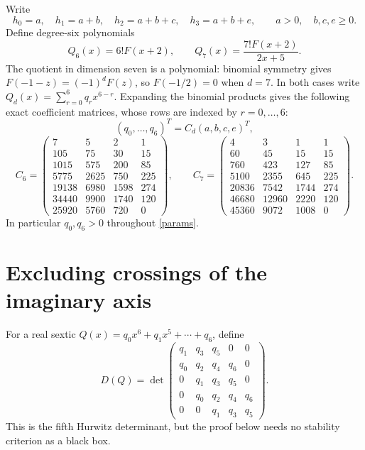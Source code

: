\documentclass[11pt]{article}
\begin{document}
Write
\begin{equation}\label{params}
 h_0=a,\quad h_1=a+b,\quad h_2=a+b+c,\quad h_3=a+b+e,
 \qquad a>0,\quad b,c,e\ge0.
\end{equation}
Define degree-six polynomials
\[
 Q_6(x)=6!F(x+2),\qquad
 Q_7(x)=\frac{7!F(x+2)}{2x+5}.
\]
The quotient in dimension seven is a polynomial: binomial symmetry gives
$F(-1-z)=(-1)^dF(z)$, so $F(-1/2)=0$ when $d=7$.
In both cases write $Q_d(x)=\sum_{r=0}^6 q_r x^{6-r}$.
Expanding the binomial products gives the following exact coefficient
matrices, whose rows are indexed by $r=0,\ldots,6$:
\begin{equation}\label{matrix}
 (q_0,\ldots,q_6)^T=C_d(a,b,c,e)^T,
\end{equation}
\[
 C_6=\begin{pmatrix}
 7&5&2&1\\105&75&30&15\\1015&575&200&85\\5775&2625&750&225\\
 19138&6980&1598&274\\34440&9900&1740&120\\25920&5760&720&0
 \end{pmatrix},\qquad
 C_7=\begin{pmatrix}
 4&3&1&1\\60&45&15&15\\760&423&127&85\\5100&2355&645&225\\
 20836&7542&1744&274\\46680&12960&2220&120\\45360&9072&1008&0
 \end{pmatrix}.
\]
In particular $q_0,q_6>0$ throughout \eqref{params}.

\section*{Excluding crossings of the imaginary axis}
For a real sextic $Q(x)=q_0x^6+q_1x^5+\cdots+q_6$, define
\begin{equation}\label{delta}
 D(Q)=\det\begin{pmatrix}
 q_1&q_3&q_5&0&0\\
 q_0&q_2&q_4&q_6&0\\
 0&q_1&q_3&q_5&0\\
 0&q_0&q_2&q_4&q_6\\
 0&0&q_1&q_3&q_5
 \end{pmatrix}.
\end{equation}
This is the fifth Hurwitz determinant, but the proof below needs no
stability criterion as a black box.
\end{document}
